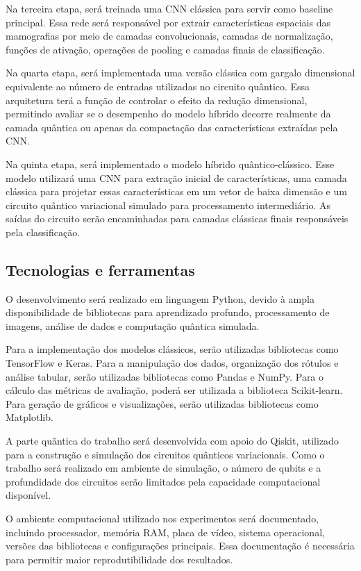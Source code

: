\documentclass[
    12pt,
    openright,
    oneside,
    a4paper,
    english,
    brazil
]{abntex2}
\begin{document}
Na terceira etapa, será treinada uma CNN clássica para servir como baseline principal. Essa rede será responsável por extrair características espaciais das mamografias por meio de camadas convolucionais, camadas de normalização, funções de ativação, operações de pooling e camadas finais de classificação.

Na quarta etapa, será implementada uma versão clássica com gargalo dimensional equivalente ao número de entradas utilizadas no circuito quântico. Essa arquitetura terá a função de controlar o efeito da redução dimensional, permitindo avaliar se o desempenho do modelo híbrido decorre realmente da camada quântica ou apenas da compactação das características extraídas pela CNN.

Na quinta etapa, será implementado o modelo híbrido quântico-clássico. Esse modelo utilizará uma CNN para extração inicial de características, uma camada clássica para projetar essas características em um vetor de baixa dimensão e um circuito quântico variacional simulado para processamento intermediário. As saídas do circuito serão encaminhadas para camadas clássicas finais responsáveis pela classificação.

\subsection{Tecnologias e ferramentas}
\label{subsec:tecnologias}

O desenvolvimento será realizado em linguagem Python, devido à ampla disponibilidade de bibliotecas para aprendizado profundo, processamento de imagens, análise de dados e computação quântica simulada.

Para a implementação dos modelos clássicos, serão utilizadas bibliotecas como TensorFlow e Keras. Para a manipulação dos dados, organização dos rótulos e análise tabular, serão utilizadas bibliotecas como Pandas e NumPy. Para o cálculo das métricas de avaliação, poderá ser utilizada a biblioteca Scikit-learn. Para geração de gráficos e visualizações, serão utilizadas bibliotecas como Matplotlib.

A parte quântica do trabalho será desenvolvida com apoio do Qiskit, utilizado para a construção e simulação dos circuitos quânticos variacionais. Como o trabalho será realizado em ambiente de simulação, o número de qubits e a profundidade dos circuitos serão limitados pela capacidade computacional disponível.

O ambiente computacional utilizado nos experimentos será documentado, incluindo processador, memória RAM, placa de vídeo, sistema operacional, versões das bibliotecas e configurações principais. Essa documentação é necessária para permitir maior reprodutibilidade dos resultados.
\end{document}
